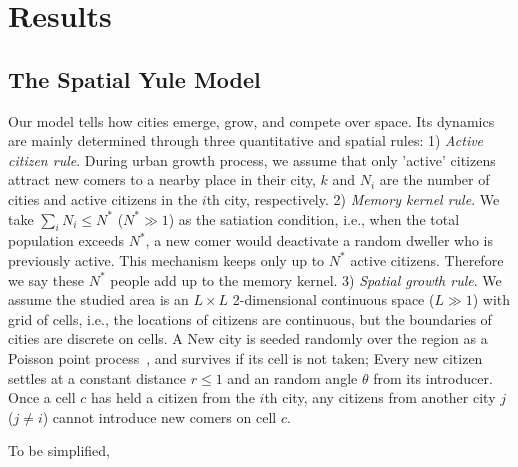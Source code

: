 \documentclass[reprint,unsortedaddress,amsmath,amssymb,aps,prl,showkeys]{revtex4-2}
\begin{document}
\section{Results}

\subsection{The Spatial Yule Model}
Our model tells how cities emerge, grow, and compete over space. Its dynamics are mainly determined through three quantitative and spatial rules: 1) \textit{Active citizen rule}. During urban growth process, we assume that only 'active' citizens attract new comers to a nearby place in their city, $k$ and $N_i$ are the number of cities and active citizens in the $i$th city, respectively. 2) \textit{Memory kernel rule}. We take $\sum_{i} N_i \le N^*$ ($N^* \gg 1$) as the satiation condition, i.e., when the total population exceeds $N^*$, a new comer would deactivate a random dweller who is previously active. This mechanism keeps only up to $N^*$ active citizens. Therefore we say these $N^*$ people add up to the memory kernel. 3) \emph{Spatial growth rule}. We assume the studied area is an $L\times L$ 2-dimensional continuous space ($L\gg 1$) with grid of cells, %
i.e., the locations of citizens are continuous, but the boundaries of cities are discrete on cells. A New city is seeded randomly over the region as a Poisson point process~\cite{miles1970homogeneous}, and survives if its cell is not taken; Every new citizen settles at a constant distance $r\le 1$ and an random angle $\theta$ from its introducer. Once a cell $c$ has held a citizen from the $i$th city, any citizens from another city $j$ ($j\ne i$) cannot introduce new comers on cell $c$. 

To be simplified, 

\end{document}
